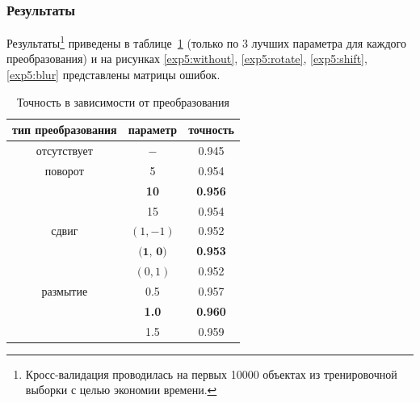 \documentclass[a4paper, 11pt]{article}
\begin{document}
    \subsubsection{Результаты}
    Результаты\footnote{Кросс-валидация проводилась на первых 10000 объектах из тренировочной выборки с целью экономии времени.} приведены в таблице\ \ref{exp5:table} (только по 3 лучших параметра для каждого преобразования) и на рисунках \ref{exp5:without}, \ref{exp5:rotate},
    \ref{exp5:shift}, \ref{exp5:blur} представлены матрицы ошибок.
    \begin{table}[h]
        \caption{Точность в зависимости от преобразования} \label{exp5:table}
        \begin{center}
            \begin{tabular}{|c|c|c|}
                \hline 
                тип преобразования & параметр & точность \\ 
                \hline
                отсутствует  & $-$ & 0.945 \\
                \hline
                поворот & 5 & 0.954 \\ 
                \cline{2-3}
                & \textbf{10} & \textbf{0.956} \\ 
                \cline{2-3}
                & 15 & 0.954 \\ 
                \hline 
                сдвиг & $(1, -1)$ & 0.952 \\ 
                \cline{2-3}
                & $\textbf{(1, 0)}$ & \textbf{0.953} \\ 
                \cline{2-3}
                & $(0, 1)$ & 0.952 \\ 
                \hline 
                размытие & 0.5 & 0.957 \\ 
                \cline{2-3}
                & \textbf{1.0} & \textbf{0.960} \\ 
                \cline{2-3}
                & 1.5 & 0.959 \\ 
                \hline 
            \end{tabular}
        \end{center}
    \end{table}
\end{document}

